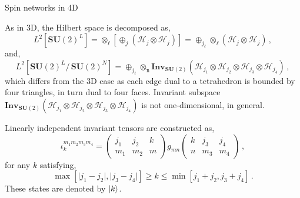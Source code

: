 \documentclass{beamer}
\begin{document}
\begin{frame}{Spin networks in 4D}
    \begin{list}{\maltese}{\leftmargin=1em \itemindent=0em}
        \item<1-> As in 3D, the Hilbert space is decomposed as,
        \begin{equation}
            L^2[{\mathbf{SU}(2)}^L]=\otimes_\ell\left[\oplus_j(\mathcal{H}_j\otimes\mathcal{H}_j)\right]=\oplus_{j_\ell}\otimes_\ell(\mathcal{H}_j\otimes\mathcal{H}_j)\,,
        \end{equation}
        and,
        \begin{equation}
            L^2[{\mathbf{SU}(2)}^L/\,{\mathbf{SU}(2)}^N]=\oplus_{j_\ell}\otimes_\mathtt{n}\mathbf{Inv}_{\mathbf{SU}(2)}(\mathcal{H}_{j_1}\otimes\mathcal{H}_{j_2}\otimes\mathcal{H}_{j_3}\otimes\mathcal{H}_{j_4})\,,
        \end{equation}
        which differs from the 3D case as each edge dual to a tetrahedron is bounded by four triangles, in turn dual to four faces. Invariant subspace $\mathbf{Inv}_{\mathbf{SU}(2)}(\mathcal{H}_{j_1}\otimes\mathcal{H}_{j_2}\otimes\mathcal{H}_{j_3}\otimes\mathcal{H}_{j_4})$ is not one-dimensional, in general.
        \item<2-> Linearly independent invariant tensors are constructed as,
        \begin{equation}
            \iota^{m_1m_2m_3m_4}_k=
            \begin{pmatrix}
                j_1 & j_2 & k \\
                m_1 & m_2 & m
            \end{pmatrix}
            g_{mn}
            \begin{pmatrix}
                k & j_3 & j_4 \\
                n & m_3 & m_4
            \end{pmatrix}\,,
        \end{equation}
        for any $k$ satisfying,
        \begin{equation}
            \operatorname{max}[\lvert j_1-j_2\rvert,\lvert j_3-j_4\rvert]\geq k\leq\operatorname{min}[j_1+j_2,j_3+j_4]\,.
        \end{equation} 
        These states are denoted by $\ket{k}$.
    \end{list}
\end{frame}
\end{document}
